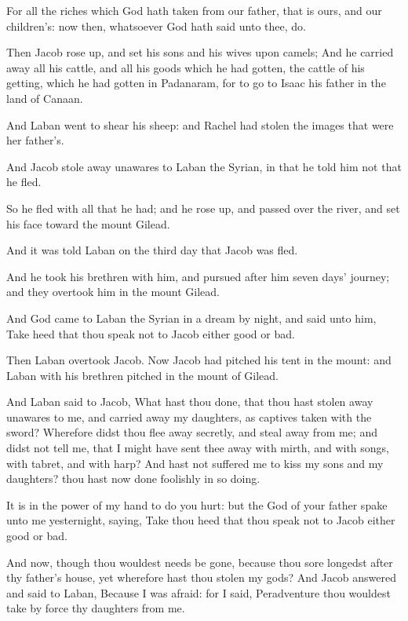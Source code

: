 \Verse For all the riches which God hath taken from our father, that is ours, and our children's: now then, whatsoever God hath said unto thee, do.

\Verse Then Jacob rose up, and set his sons and his wives upon camels; \Verse And he carried away all his cattle, and all his goods which he had gotten, the cattle of his getting, which he had gotten in Padanaram, for to go to Isaac his father in the land of Canaan.

\Verse And Laban went to shear his sheep: and Rachel had stolen the images that were her father's.

\Verse And Jacob stole away unawares to Laban the Syrian, in that he told him not that he fled.

\Verse So he fled with all that he had; and he rose up, and passed over the river, and set his face toward the mount Gilead.

\Verse And it was told Laban on the third day that Jacob was fled.

\Verse And he took his brethren with him, and pursued after him seven days' journey; and they overtook him in the mount Gilead.

\Verse And God came to Laban the Syrian in a dream by night, and said unto him, Take heed that thou speak not to Jacob either good or bad.

\Verse Then Laban overtook Jacob. Now Jacob had pitched his tent in the mount: and Laban with his brethren pitched in the mount of Gilead.

\Verse And Laban said to Jacob, What hast thou done, that thou hast stolen away unawares to me, and carried away my daughters, as captives taken with the sword?  \Verse Wherefore didst thou flee away secretly, and steal away from me; and didst not tell me, that I might have sent thee away with mirth, and with songs, with tabret, and with harp?  \Verse And hast not suffered me to kiss my sons and my daughters? thou hast now done foolishly in so doing.

\Verse It is in the power of my hand to do you hurt: but the God of your father spake unto me yesternight, saying, Take thou heed that thou speak not to Jacob either good or bad.

\Verse And now, though thou wouldest needs be gone, because thou sore longedst after thy father's house, yet wherefore hast thou stolen my gods?  \Verse And Jacob answered and said to Laban, Because I was afraid: for I said, Peradventure thou wouldest take by force thy daughters from me.


